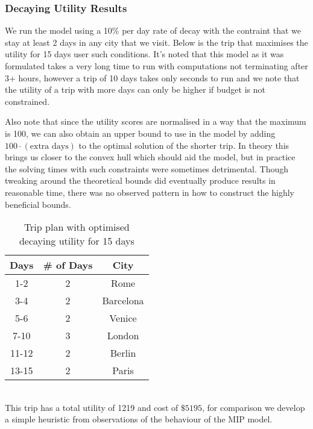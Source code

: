 \documentclass[12pt]{article}
\begin{document}
\subsubsection{Decaying Utility Results}
We run the model using a 10\% per day rate of decay with the contraint that we stay at least 2 days in any city that we visit. Below is the trip that maximises the utility for 15 days user such conditions. It's noted that this model as it was formulated takes a very long time to run with computations not terminating after 3+ hours, however a trip of 10 days takes only seconds to run and we note that the utility of a trip with more days can only be higher if budget is not constrained. 

Also note that since the utility scores are normalised in a way that the maximum is 100, we can also obtain an upper bound to use in the model by adding $100 \cdot (\text{extra days})$ to the optimal solution of the shorter trip. In theory this brings us closer to the convex hull which should aid the model, but in practice the solving times with such constraints were sometimes detrimental. Though tweaking around the theoretical bounds did eventually produce results in reasonable time, there was no observed pattern in how to construct the highly beneficial bounds. \\
\begin{table}[h]
\caption{Trip plan with optimised decaying utility for 15 days}
\centering
\begin{tabular}{c|c|c}
	\hline
	\rule{0pt}{2ex} Days & \# of Days & City \\
	\hline
	1-2 & 2 & Rome \\
	3-4 & 2 & Barcelona \\
	5-6 & 2 & Venice \\
	7-10 & 3 & London \\
	11-12 & 2 & Berlin \\
	13-15 & 2 & Paris \\
	\hline
\end{tabular}
\vspace{1mm}
\end{table}\\
This trip has a total utility of 1219 and cost of $\$5195$, for comparison we develop a simple heuristic from observations of the behaviour of the MIP model.
\end{document}
